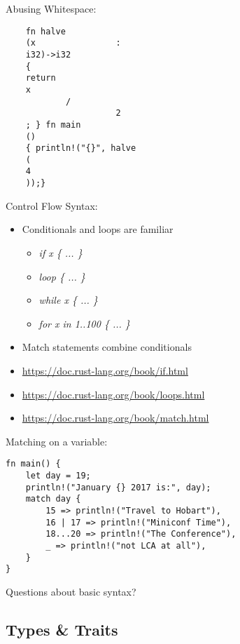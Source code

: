 \documentclass[100pt]{beamer}
\begin{document}
\begin{frame}[fragile]
    Abusing Whitespace:

\begin{verbatim}
    fn halve
    (x                :
    i32)->i32
    {
    return
    x
            /
                      2
    ; } fn main
    ()
    { println!("{}", halve
    (
    4
    ));}
\end{verbatim}

\end{frame}

\begin{frame}
    Control Flow Syntax:
    \begin{itemize}
        \item Conditionals and loops are familiar
        \begin{itemize}
            \item \textit{if x \{ ... \}}
            \item \textit{loop \{ ... \}}
            \item \textit{while x \{ ... \}}
            \item \textit{for x in 1..100 \{ ... \}}
        \end{itemize}
        \item Match statements combine conditionals
        \item \url{https://doc.rust-lang.org/book/if.html}
        \item \url{https://doc.rust-lang.org/book/loops.html}
        \item \url{https://doc.rust-lang.org/book/match.html}
    \end{itemize}
\end{frame}

\begin{frame}[fragile]
Matching on a variable:
\begin{verbatim}
fn main() {
    let day = 19;
    println!("January {} 2017 is:", day);
    match day {
        15 => println!("Travel to Hobart"),
        16 | 17 => println!("Miniconf Time"),
        18...20 => println!("The Conference"),
        _ => println!("not LCA at all"),
    }
}
\end{verbatim}
\end{frame}
\begin{frame}
    Questions about basic syntax?
\end{frame}


\subsection{Types \& Traits}
\end{document}
